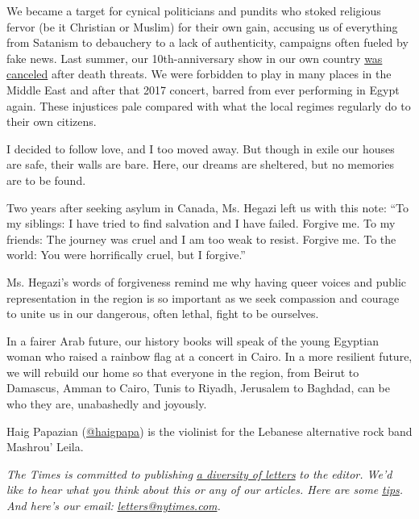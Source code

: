 We became a target for cynical politicians and pundits who stoked
religious fervor (be it Christian or Muslim) for their own gain,
accusing us of everything from Satanism to debauchery to a lack of
authenticity, campaigns often fueled by fake news. Last summer, our
10th-anniversary show in our own country
\href{https://www.nytimes.com/2019/07/31/world/middleeast/lebanon-mashrou-leila-blasphemy.html\#:~:text=Lebanese\%20Band's\%20Concert\%20Is\%20Canceled\%20After\%20It's\%20Accused\%20of\%20Blasphemy,-Mashrou'\%20Leila\%20has\&text=A\%20Lebanese\%20music\%20festival\%20has,Madonna\%20as\%20the\%20Virgin\%20Mary.}{was
canceled} after death threats. We were forbidden to play in many places
in the Middle East and after that 2017 concert, barred from ever
performing in Egypt again. These injustices pale compared with what the
local regimes regularly do to their own citizens.

I decided to follow love, and I too moved away. But though in exile our
houses are safe, their walls are bare. Here, our dreams are sheltered,
but no memories are to be found.

Two years after seeking asylum in Canada, Ms. Hegazi left us with this
note: ``To my siblings: I have tried to find salvation and I have
failed. Forgive me. To my friends: The journey was cruel and I am too
weak to resist. Forgive me. To the world: You were horrifically cruel,
but I forgive.''

Ms. Hegazi's words of forgiveness remind me why having queer voices and
public representation in the region is so important as we seek
compassion and courage to unite us in our dangerous, often lethal, fight
to be ourselves.

In a fairer Arab future, our history books will speak of the young
Egyptian woman who raised a rainbow flag at a concert in Cairo. In a
more resilient future, we will rebuild our home so that everyone in the
region, from Beirut to Damascus, Amman to Cairo, Tunis to Riyadh,
Jerusalem to Baghdad, can be who they are, unabashedly and joyously.

Haig Papazian
(\href{https://www.instagram.com/haigpapa/?hl=en}{@haigpapa}) is the
violinist for the Lebanese alternative rock band Mashrou' Leila.

\emph{The Times is committed to publishing}
\href{https://www.nytimes.com/2019/01/31/opinion/letters/letters-to-editor-new-york-times-women.html}{\emph{a
diversity of letters}} \emph{to the editor. We'd like to hear what you
think about this or any of our articles. Here are some}
\href{https://help.nytimes.com/hc/en-us/articles/115014925288-How-to-submit-a-letter-to-the-editor}{\emph{tips}}\emph{.
And here's our email:}
\href{mailto:letters@nytimes.com}{\emph{letters@nytimes.com}}\emph{.}


